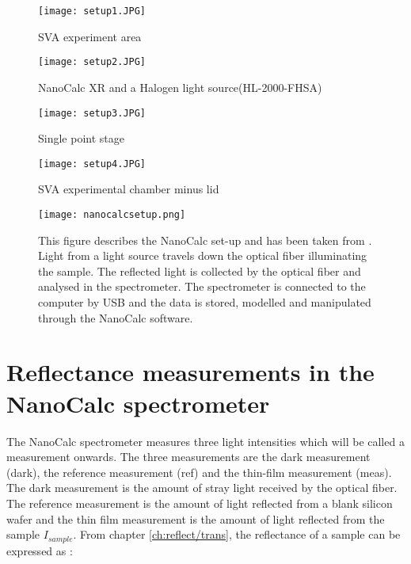 \documentclass[MasterThesisMain.tex]{subfiles}
\begin{document}
	\begin{figure}[ht] 
	  \begin{minipage}[b]{0.5\linewidth}
	    \centering
	    \texttt{[image: setup1.JPG]} 
	    \caption{SVA experiment area}
	    \label{fig:exparea}  
	    \vspace{4ex}
	  \end{minipage}%
	  \begin{minipage}[b]{0.5\linewidth}
	    \centering
	    \texttt{[image: setup2.JPG]} 
	    \caption{NanoCalc XR and a Halogen light source(HL-2000-FHSA)}
	    \label{fig:speclight} 
	    \vspace{4ex}
	  \end{minipage} 
	  \begin{minipage}[b]{0.5\linewidth}
	    \centering
	    \texttt{[image: setup3.JPG]} 
	    \caption{Single point stage} 
	    \label{fig:Singlestage}
	    \vspace{4ex}
	  \end{minipage}%
	  \begin{minipage}[b]{0.5\linewidth}
	    \centering
	    \texttt{[image: setup4.JPG]} 
	    \caption{SVA experimental chamber \break minus lid}
	    \label{fig:SVAchamber} 
	    \vspace{4ex}
	  \end{minipage} 
	\end{figure}
	
	\begin{figure}
	\centering
		\texttt{[image: nanocalcsetup.png]}
		\caption{This figure describes the NanoCalc set-up and has been taken from \cite{nanocalcmanual}. Light from a light source travels down the optical fiber illuminating the sample. The reflected light is collected by the optical fiber and analysed in the spectrometer. The spectrometer is connected to the computer by USB and the data is stored, modelled and manipulated through the NanoCalc software.}
		\label{fig:nanocalcsetup}
	\end{figure}
	
\section{Reflectance measurements in the NanoCalc spectrometer}
The NanoCalc spectrometer measures three light intensities which will be called a measurement onwards. The three measurements are the dark measurement (dark), the reference measurement (ref) and the thin-film measurement (meas). The dark measurement is the amount of stray light received by the optical fiber. The reference measurement is the amount of light reflected from a blank silicon wafer and the thin film measurement is the amount of light reflected from the sample $I_{sample}$. From chapter \ref{ch:reflect/trans}, the reflectance of a sample can be expressed as :
\end{document}
